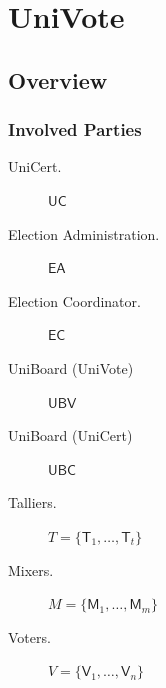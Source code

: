 \documentclass[bibtotoc,halfparskip,oneside]{scrreprt}
\newcommand{\EA}{\ensuremath{\mathsf{EA}}\xspace}
\newcommand{\EC}{\ensuremath{\mathsf{EC}}\xspace}
\newcommand{\UBC}{\ensuremath{\mathsf{UBC}}\xspace}
\newcommand{\UBV}{\ensuremath{\mathsf{UBV}}\xspace}
\newcommand{\UC}{\ensuremath{\mathsf{UC}}\xspace}
\newcommand{\Tallier}[1]{\ensuremath{\mathsf{T}_{#1}}\xspace}
\newcommand{\Mixer}[1]{\ensuremath{\mathsf{M}_{#1}}\xspace}
\newcommand{\Voter}[1]{\ensuremath{\mathsf{V}_{#1}}\xspace}
\begin{document}
	
	
	
	\chapter{UniVote}
	
	\section{Overview}
	
	
	\subsection{Involved Parties}
	
	\begin{description}
		\item[UniCert.] \UC
		\item[Election Administration.] \EA
		\item[Election Coordinator.] \EC
		\item[UniBoard (UniVote)] \UBV
		\item[UniBoard (UniCert)] \UBC
		\item[Talliers.] $T=\{\Tallier{1},\ldots,\Tallier{t}\}$
		\item[Mixers.] $M=\{\Mixer{1},\ldots,\Mixer{m}\}$
		\item[Voters.] $V=\{\Voter{1},\ldots,\Voter{n}\}$
	\end{description}
	
\end{document}
